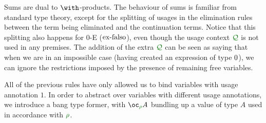 Sums are dual to $\withT{}{}$-products.
The behaviour of sums is familiar from standard type theory, except for the
splitting of usages in the elimination rules between the term being
eliminated and the continuation terms.
Notice that this splitting also happens for $0$-E ($\operatorname{ex-falso}$), even though the
usage context $\resctx Q$ is not used in any premises.
The addition of the extra $\resctx Q$ can be seen as saying that when we are in
an impossible case (having created an expression of type $0$), we can
ignore the restrictions imposed by the presence of remaining free variables.


All of the previous rules have only allowed us to bind variables with usage
annotation $1$.
In order to abstract over variables with different usage annotations, we
introduce a bang type former, with $\excl{\rho}{A}$ bundling up a value of type
$A$ used in accordance with $\rescomment \rho$.


